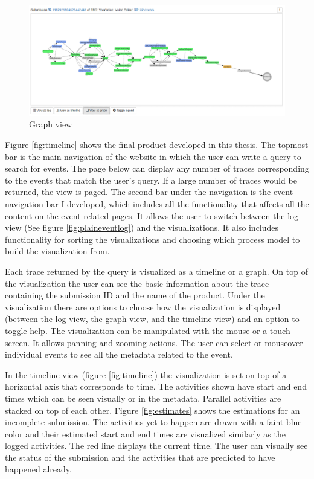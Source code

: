 \begin{figure}[htb]
\centering \includegraphics[width=\linewidth]{gfx/screenshots/graph.png}
\caption{Graph view \label{fig:graph}}
\end{figure}

Figure \ref{fig:timeline} shows the final product developed in this thesis.
The topmost bar is the main navigation of the website in which the user can write a query to search for events.
The page below can display any number of traces corresponding to the events that match the user's query.
If a large number of traces would be returned, the view is paged.
The second bar under the navigation is the event navigation bar I developed, which includes all the functionality that affects all the content on the event-related pages.
It allows the user to switch between the log view (See figure \ref{fig:plaineventlog}) and the visualizations.
It also includes functionality for sorting the visualizations and choosing which process model to build the visualization from.

Each trace returned by the query is visualized as a timeline or a graph. On top of the visualization the user can see the basic information about the trace containing the submission ID and the name of the product.
Under the visualization there are options to choose how the visualization is displayed (between the log view, the graph view, and the timeline view) and an option to toggle help.
The visualization can be manipulated with the mouse or a touch screen. It allows panning and zooming actions.
The user can select or mouseover individual events to see all the metadata related to the event.

In the timeline view (figure \ref{fig:timeline}) the visualization is set on top of a horizontal axis that corresponds to time. The activities shown have start and end times which can be seen visually or in the metadata.
Parallel activities are stacked on top of each other.
Figure \ref{fig:estimates} shows the estimations for an incomplete submission.
The activities yet to happen are drawn with a faint blue color and their estimated start and end times are visualized similarly as the logged activities.
The red line displays the current time.
The user can visually see the status of the submission and the activities that are predicted to have happened already.


